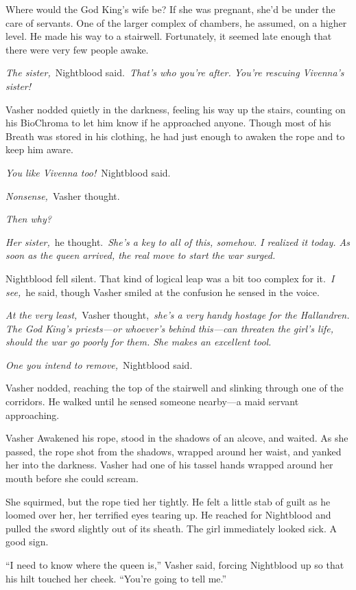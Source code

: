 Where would the God King’s wife be? If she was pregnant, she’d be under the care of servants. One of the larger complex of chambers, he assumed, on a higher level. He made his way to a stairwell. Fortunately, it seemed late enough that there were very few people awake.

\textit{The sister,}~Nightblood said.~\textit{That’s who you’re after. You’re rescuing Vivenna’s sister!}

Vasher nodded quietly in the darkness, feeling his way up the stairs, counting on his BioChroma to let him know if he approached anyone. Though most of his Breath was stored in his clothing, he had just enough to awaken the rope and to keep him aware.

\textit{You like Vivenna too!}~Nightblood said.

\textit{Nonsense,}~Vasher thought.

\textit{Then why?}

\textit{Her sister,}~he thought.~\textit{She’s a key to all of this, somehow. I realized it today. As soon as the queen arrived, the real move to start the war surged.}

Nightblood fell silent. That kind of logical leap was a bit too complex for it.~\textit{I see,}~he said, though Vasher smiled at the confusion he sensed in the voice.

\textit{At the very least,}~Vasher thought,~\textit{she’s a very handy hostage for the Hallandren. The God King’s priests—or whoever’s behind this—can threaten the girl’s life, should the war go poorly for them. She makes an excellent tool.}

\textit{One you intend to remove,}~Nightblood said.

Vasher nodded, reaching the top of the stairwell and slinking through one of the corridors. He walked until he sensed someone nearby—a maid servant approaching.

Vasher Awakened his rope, stood in the shadows of an alcove, and waited. As she passed, the rope shot from the shadows, wrapped around her waist, and yanked her into the darkness. Vasher had one of his tassel hands wrapped around her mouth before she could scream.

She squirmed, but the rope tied her tightly. He felt a little stab of guilt as he loomed over her, her terrified eyes tearing up. He reached for Nightblood and pulled the sword slightly out of its sheath. The girl immediately looked sick. A good sign.

“I need to know where the queen is,” Vasher said, forcing Nightblood up so that his hilt touched her cheek. “You’re going to tell me.”

